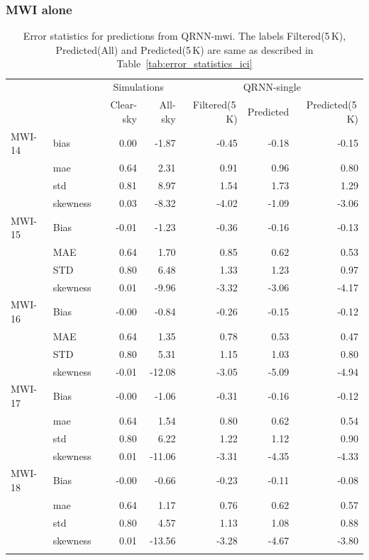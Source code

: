 \documentclass[amt, manuscript]{copernicus}
\begin{document}
\subsubsection{MWI alone}
%
\begin{table}[t]
	\caption{Error statistics for predictions from QRNN-mwi. The labels Filtered(5\,K), Predicted(All) and Predicted(5\,K) are same as described in Table~\ref{tab:error_statistics_ici}}
	\label{tab:statistics_mwi-alone}
	\begin{tabular}{llrr|rrr}
		\tophline
		&&\multicolumn{2}{c|}{Simulations}& \multicolumn{3}{c}{QRNN-single} \\
		\cline{3-7}
		&&   Clear-sky &   All-sky &  Filtered(5\,K) & Predicted & Predicted(5\,K) \\
		\middlehline
		MWI-14 		&bias     & 0.00 & -1.87 & -0.45 & -0.18 & -0.15 \\
					&mae      & 0.64 &  2.31 &  0.91 &  0.96 &  0.80 \\
					&std      & 0.81 &  8.97 &  1.54 &  1.73 &  1.29 \\
					&skewness & 0.03 & -8.32 & -4.02 & -1.09 & -3.06 \\
		\middlehline
		MWI-15 		&Bias     & -0.01 & -1.23 & -0.36 & -0.16 & -0.13 \\
					&MAE      &  0.64 &  1.70 &  0.85 &  0.62 &  0.53 \\
					&STD      &  0.80 &  6.48 &  1.33 &  1.23 &  0.97 \\
					&skewness &  0.01 & -9.96 & -3.32 & -3.06 & -4.17 \\
		\middlehline	
		MWI-16 		&Bias     & -0.00 &  -0.84 & -0.26 & -0.15 & -0.12 \\
					&MAE      &  0.64 &   1.35 &  0.78 &  0.53 &  0.47 \\
					&STD      &  0.80 &   5.31 &  1.15 &  1.03 &  0.80 \\
					&skewness & -0.01 & -12.08 & -3.05 & -5.09 & -4.94 \\	
		\middlehline			
		MWI-17 		&Bias     & -0.00 &  -1.06 & -0.31 & -0.16 & -0.12 \\
					&mae      &  0.64 &   1.54 &  0.80 &  0.62 &  0.54 \\
					&std      &  0.80 &   6.22 &  1.22 &  1.12 &  0.90 \\
					&skewness &  0.01 & -11.06 & -3.31 & -4.35 & -4.33 \\	
		\middlehline			
		MWI-18 		&Bias     & -0.00 &  -0.66 & -0.23 & -0.11 & -0.08 \\
					&mae      &  0.64 &   1.17 &  0.76 &  0.62 &  0.57 \\
					&std      &  0.80 &   4.57 &  1.13 &  1.08 &  0.88 \\
					&skewness &  0.01 & -13.56 & -3.28 & -4.67 & -3.80 \\	
		\bottomhline				
	\end{tabular}	
	\belowtable{} %
\end{table}
\end{document}
